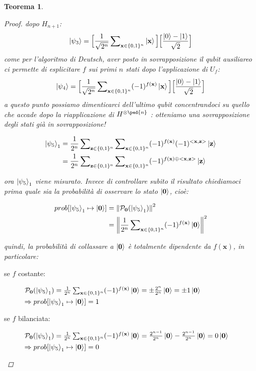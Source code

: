 \documentclass[12pt,a4paper,openright]{report}
\newcommand*\xor{\mathbin{\oplus}}
\newcommand{\norm}[1]{\left\lVert#1\right\rVert}
\newtheorem{mythm}{Teorema}[chapter]
\begin{document}
\begin{mythm}
\begin{proof}
dopo $H_{n+1}$:
\[
    \ket{\psi_3} = \Big[\frac{1}{\sqrt{2^n}}\sum\nolimits_{\textbf{x}\in{\{0,1\}^n}}\ket{\textbf{x}}\Big]\Big[\frac{\ket{0}-\ket{1}}{\sqrt2}\Big]
\]
come per l'algoritmo di Deutsch, aver posto in sovrapposizione il qubit ausiliareo ci permette di esplicitare $f$ sui primi $n$ stati dopo l'applicazione di $U_f$:
\[
    \ket{\psi_4} = \Big[\frac{1}{\sqrt{2^n}}\sum\nolimits_{\textbf{x}\in{\{0,1\}^n}}(-1)^{f(\textbf{x})}\ket{\textbf{x}}\Big]\Big[\frac{\ket{0}-\ket{1}}{\sqrt2}\Big]
\]
a questo punto possiamo dimenticarci dell'ultimo qubit concentrandoci su quello che accade dopo la riapplicazione di $H^{\otimes\ped{n}}$ : otteniamo una sovrapposizione degli stati già in sovrapposizione!
\begin{center}
    \begin{align*}
        \ket{\psi_5}_1 &= \frac{1}{2^n}\sum\nolimits_{\textbf{z}\in{\{0,1\}^n}} \sum\nolimits_{\textbf{x}\in{\{0,1\}^n}}(-1)^{f(\textbf{x})}(-1)^{<\textbf{x},\textbf{z}>}\ket{\textbf{z}} \\
                       &= \frac{1}{2^n}\sum\nolimits_{\textbf{z}\in{\{0,1\}^n}} \sum\nolimits_{\textbf{x}\in{\{0,1\}^n}}(-1)^{f(\textbf{x}) \xor <\textbf{x},\textbf{z}>}\ket{\textbf{z}}
    \end{align*}
\end{center}
ora $\ket{\psi_5}_1$ viene misurato. Invece di controllare subito il risultato chiediamoci prima quale sia la probabilità di osservare lo stato $\ket{\textbf{0}}$, cioè:
\begin{center}
    \begin{align*}
        prob[\ket{\psi_5}_1 \mapsto \ket{\textbf{0}}] &= \norm{\mathcal{P}_{\textbf{0}}(\ket{\psi_5}_1)}^2\\
                                                      &= \norm{\frac{1}{2^n}\sum\nolimits_{\textbf{x}\in{\{0,1\}^n}}(-1)^{f(\textbf{x})}\ket{\textbf{0}}}^2
    \end{align*}
\end{center}
quindi, la probabilità di collassare a $\ket{\textbf{0}}$ è totalmente dipendente da $f(\textbf{x})$, in particolare:
\begin{description}
    \item [se $f$ costante:] $\mathcal{P}_{\textbf{0}}(\ket{\psi_5}_1) = \frac{1}{2^n}\sum\nolimits_{\textbf{x}\in{\{0,1\}^n}}(-1)^{f(\textbf{x})}\ket{\textbf{0}} = \pm \frac{2^n}{2^n}\ket{\textbf{0}} = \pm 1\ket{\textbf{0}}$ \\
    $\Rightarrow prob[\ket{\psi_5}_1 \mapsto \ket{\textbf{0}}] = 1$
    \item [se $f$ bilanciata:] $\mathcal{P}_{\textbf{0}}(\ket{\psi_5}_1) = \frac{1}{2^n}\sum\nolimits_{\textbf{x}\in{\{0,1\}^n}}(-1)^{f(\textbf{x})}\ket{\textbf{0}} =  \frac{2^{n-1}}{2^n}\ket{\textbf{0}} - \frac{2^{n-1}}{2^n}\ket{\textbf{0}} = 0\ket{\textbf{0}}$\\
    $\Rightarrow prob[\ket{\psi_5}_1 \mapsto \ket{\textbf{0}}] = 0$
\end{description} 


\end{proof}
\end{mythm}
\end{document}
